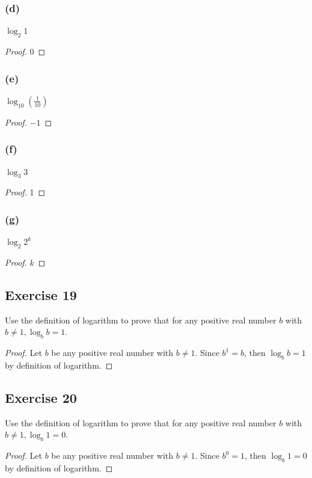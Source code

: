 \documentclass[14pt]{extarticle}
\begin{document}
\subsubsection{(d)}
\(\log_{2} 1\)

\begin{proof}
0
\end{proof}

\subsubsection{(e)}
\(\log_{10}(\frac{1}{10})\)

\begin{proof}
$-1$
\end{proof}

\subsubsection{(f)}
\(\log_{3} 3\)

\begin{proof}
1
\end{proof}

\subsubsection{(g)}
\(\log_{2} 2^k\)

\begin{proof}
$k$
\end{proof}

\subsection{Exercise 19}
Use the definition of logarithm to prove that for any positive real number $b$ with \(b \neq 1, \log_b b = 1\).

\begin{proof}
Let $b$ be any positive real number with \(b \neq 1\). Since \(b^1 = b\), then \(\log_b b = 1\) by definition of logarithm.
\end{proof}

\subsection{Exercise 20}
Use the definition of logarithm to prove that for any positive real number $b$ with \(b \neq 1, \log_b 1 = 0\).

\begin{proof}
Let $b$ be any positive real number with \(b \neq 1\). Since \(b^0 = 1\), then \(\log_b 1 = 0\) by definition of logarithm.
\end{proof}
\end{document}
